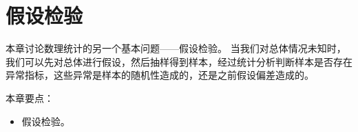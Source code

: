 \chapter{假设检验}

本章讨论数理统计的另一个基本问题——假设检验。
当我们对总体情况未知时，我们可以先对总体进行假设，然后抽样得到样本，经过统计分析判断样本是否存在异常指标，这些异常是样本的随机性造成的，还是之前假设偏差造成的。

本章要点：
\begin{itemize}
    \item 假设检验。
\end{itemize}

\newpage


\newpage





